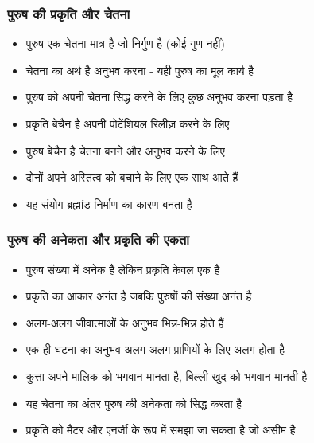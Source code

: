 \begin{frame}[fragile]\frametitle{पुरुष की प्रकृति और चेतना}
      \begin{itemize}
          \item पुरुष एक चेतना मात्र है जो निर्गुण है (कोई गुण नहीं)
          \item चेतना का अर्थ है अनुभव करना - यही पुरुष का मूल कार्य है
          \item पुरुष को अपनी चेतना सिद्ध करने के लिए कुछ अनुभव करना पड़ता है
          \item प्रकृति बेचैन है अपनी पोटेंशियल रिलीज़ करने के लिए
          \item पुरुष बेचैन है चेतना बनने और अनुभव करने के लिए
          \item दोनों अपने अस्तित्व को बचाने के लिए एक साथ आते हैं
          \item यह संयोग ब्रह्मांड निर्माण का कारण बनता है
      \end{itemize}
\end{frame}

\begin{frame}[fragile]\frametitle{पुरुष की अनेकता और प्रकृति की एकता}
      \begin{itemize}
          \item पुरुष संख्या में अनेक हैं लेकिन प्रकृति केवल एक है
          \item प्रकृति का आकार अनंत है जबकि पुरुषों की संख्या अनंत है
          \item अलग-अलग जीवात्माओं के अनुभव भिन्न-भिन्न होते हैं
          \item एक ही घटना का अनुभव अलग-अलग प्राणियों के लिए अलग होता है
          \item कुत्ता अपने मालिक को भगवान मानता है, बिल्ली खुद को भगवान मानती है
          \item यह चेतना का अंतर पुरुष की अनेकता को सिद्ध करता है
          \item प्रकृति को मैटर और एनर्जी के रूप में समझा जा सकता है जो असीम है
      \end{itemize}
\end{frame}

